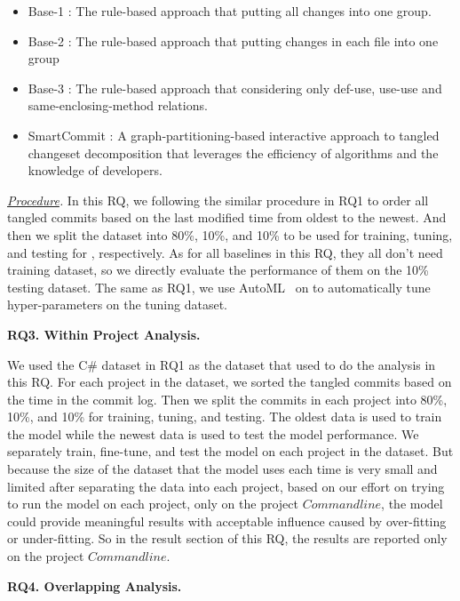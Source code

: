 \begin{itemize}
	\item Base-1 \cite{smartcommit-fse21}: The rule-based approach that putting all changes into one group. 
	\item Base-2 \cite{smartcommit-fse21}: The rule-based approach that putting changes in each file into one group 
	\item Base-3 \cite{smartcommit-fse21}: The rule-based approach that considering only def-use, use-use and	same-enclosing-method relations.
	\item SmartCommit \cite{smartcommit-fse21}: A graph-partitioning-based interactive approach to tangled changeset decomposition that leverages the efficiency of algorithms and the knowledge of developers.
\end{itemize}

\textit{ \underline{Procedure}.}
In this RQ, we following the similar procedure in RQ1 to order all tangled commits based on the last modified time from oldest to the newest. And then we split the dataset into 80\%, 10\%, and 10\% to be used for training, tuning, and testing for \tool, respectively. As for all baselines in this RQ, they all don't need training dataset, so we directly evaluate the performance of them on the 10\% testing dataset. The same as RQ1, we use AutoML~\cite{NNI} on \tool to automatically tune hyper-parameters on the tuning dataset.

\noindent\textbf{RQ3. Within Project Analysis.}

We used the C\# dataset in RQ1 as the dataset that used to do the analysis in this RQ. For each project in the dataset, we sorted the tangled commits based on the time in the commit log. Then we split the commits in each project into 80\%, 10\%, and 10\% for training, tuning, and testing. The oldest data is used to train the model while the newest data is used to test the model performance. We separately train, fine-tune, and test the model on each project in the dataset. But because the size of the dataset that the model uses each time is very small and limited after separating the data into each project, based on our effort on trying to run the model on each project, only on the project $Commandline$, the model could provide meaningful results with acceptable influence caused by over-fitting or under-fitting. So in the result section of this RQ, the results are reported only on the project $Commandline$. 

\noindent\textbf{RQ4. Overlapping Analysis.}

